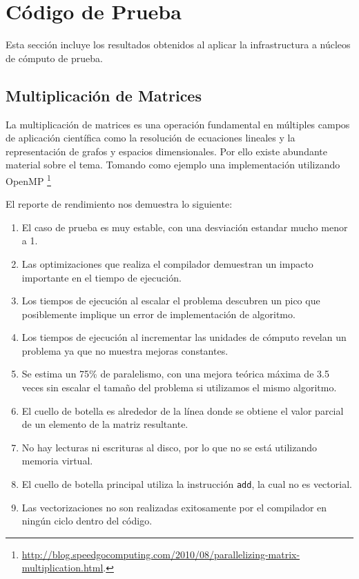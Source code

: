 \documentclass[a4paper]{report}
\begin{document}
\section{Código de Prueba}

Esta sección incluye los resultados obtenidos al aplicar la infrastructura a núcleos de cómputo de prueba.

\subsection{Multiplicación de Matrices}

La multiplicación de matrices es una operación fundamental en múltiples campos de aplicación científica como la resolución de ecuaciones lineales y la representación de grafos y espacios dimensionales. Por ello existe abundante material sobre el tema. Tomando como ejemplo una implementación utilizando OpenMP \footnote{\href{http://blog.speedgocomputing.com/2010/08/parallelizing-matrix-multiplication.html}{http://blog.speedgocomputing.com/2010/08/parallelizing-matrix-multiplication.html}.}

\bigskip

El reporte de rendimiento nos demuestra lo siguiente:

\begin{enumerate}
\item El caso de prueba es muy estable, con una desviación estandar mucho menor a 1.
\item Las optimizaciones que realiza el compilador demuestran un impacto importante en el tiempo de ejecución.
\item Los tiempos de ejecución al escalar el problema descubren un pico que posiblemente implique un error de implementación de algoritmo.
\item Los tiempos de ejecución al incrementar las unidades de cómputo revelan un problema ya que no muestra mejoras constantes.
\item Se estima un 75\% de paralelismo, con una mejora teórica máxima de 3.5 veces sin escalar el tamaño del problema si utilizamos el mismo algoritmo.
\item El cuello de botella es alrededor de la línea donde se obtiene el valor parcial de un elemento de la matriz resultante.
\item No hay lecturas ni escrituras al disco, por lo que no se está utilizando memoria virtual.
\item El cuello de botella principal utiliza la instrucción {\tt add}, la cual no es vectorial.
\item Las vectorizaciones no son realizadas exitosamente por el compilador en ningún ciclo dentro del código.
\end{enumerate}
\end{document}
